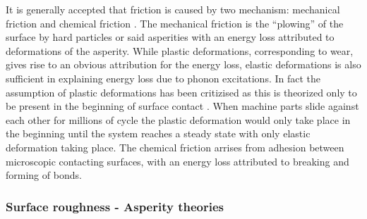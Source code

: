 It is generally accepted that friction is caused by two mechanism: mechanical
friction and chemical friction \cite{kim_nano-scale_2009}. The mechanical
friction is the ``plowing'' of the surface by hard particles or said asperities
with an energy loss attributed to deformations of the asperity. While plastic
deformations, corresponding to wear, gives rise to an obvious attribution for
the energy loss, elastic deformations is also sufficient in explaining energy
loss due to phonon excitations. In fact the assumption of plastic deformations
has been critizised as this is theorized only to be present in the beginning of
surface contact \cite{CARBONE20082555}. When machine parts slide against each
other for millions of cycle the plastic deformation would only take place in the
beginning until the system reaches a steady state with only elastic deformation
taking place. The chemical friction arrises from adhesion between microscopic
contacting surfaces, with an energy loss attributed to breaking and forming of
bonds. 







\subsubsection{Surface roughness - Asperity theories}

